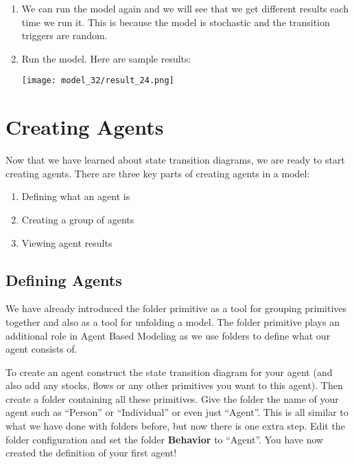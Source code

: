\documentclass[]{memoir}
\makeatletter
\def\maxwidth{\ifdim\Gin@nat@width>\linewidth\linewidth
\else\Gin@nat@width\fi}
\let\Oldincludegraphics\includegraphics
\renewcommand{\includegraphics}[1]{\Oldincludegraphics[width=\maxwidth]{#1}}
\renewcommand{\u}[1]{\textbf{#1}}
\makeatother
\begin{document}
\begin{oframed}
\begin{enumerate}
\item 

We can run the model again and we will see that we get different results each time we run it. This is because the model is stochastic and the transition triggers are random.


\item Run the model. Here are sample results:\par \begin{minipage}{\linewidth}  \centering \texttt{[image: model\_32/result\_24.png]}
\end{minipage}

\end{enumerate} \end{oframed}

\section{Creating Agents}

Now that we have learned about state transition diagrams, we are ready
to start creating agents. There are three key parts of creating agents
in a model:

\begin{enumerate}
\def\labelenumi{\arabic{enumi}.}
\itemsep1pt\parskip0pt
\item
  Defining what an agent is
\item
  Creating a group of agents
\item
  Viewing agent results
\end{enumerate}

\subsection{Defining Agents}

We have already introduced the folder primitive as a tool for grouping
primitives together and also as a tool for unfolding a model. The folder
primitive plays an additional role in Agent Based Modeling as we use
folders to define what our agent consists of.

To create an agent construct the state transition diagram for your agent
(and also add any stocks, flows or any other primitives you want to this
agent). Then create a folder containing all these primitives. Give the
folder the name of your agent such as ``Person'' or ``Individual'' or
even just ``Agent''. This is all similar to what we have done with
folders before, but now there is one extra step. Edit the folder
configuration and set the folder \u{Behavior} to ``Agent''. You have now
created the definition of your first agent!
\end{document}
